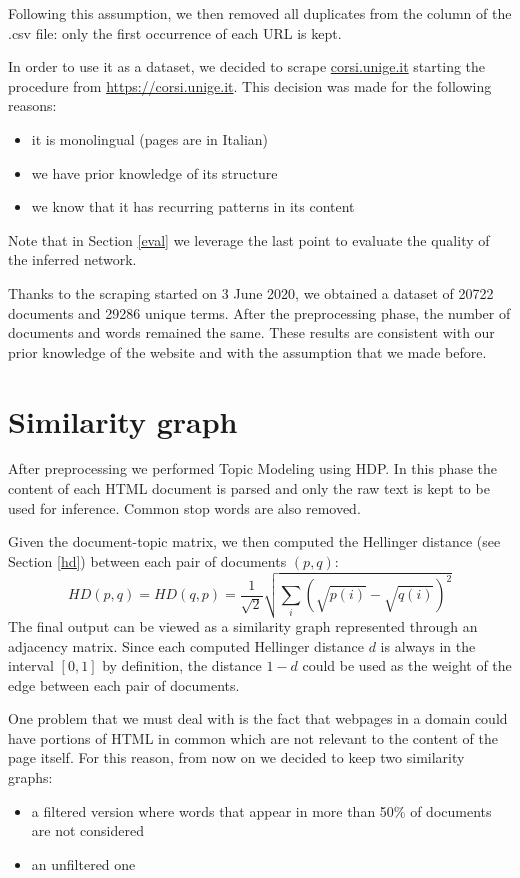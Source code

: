 Following this assumption, we then removed all duplicates from the  column
of the .csv file: only the first occurrence of each URL is kept.

In order to use it as a dataset, we decided to scrape \url{corsi.unige.it} starting the procedure from \url{https://corsi.unige.it}. 
This decision was made for the following reasons:
\begin{itemize}
    \item it is monolingual (pages are in Italian)
    \item we have prior knowledge of its structure 
    \item we know that it has recurring patterns in its content
\end{itemize}
Note that in Section \ref{eval} we leverage the last point to evaluate the quality of the inferred network.

Thanks to the scraping started on 3 June 2020, we obtained a dataset of 20722 documents and 29286 unique terms. 
After the preprocessing phase, the number of documents and words remained the same.
These results are consistent with our prior knowledge of the website and with the assumption that we made before.



\section{Similarity graph} \label{sgexp}
After preprocessing we performed Topic Modeling using HDP. 
In this phase the content of each HTML document is
parsed and only the raw text is kept to be used for inference. Common stop words are also removed.

Given the document-topic matrix,
we then computed the Hellinger distance (see Section \ref{hd}) between each pair of documents $(p, q)$:
\[\mathit{HD}(p, q) = \mathit{HD}(q, p) = \frac{1}{\sqrt{2}} \sqrt{\sum_i (\sqrt{p(i)} - \sqrt{q(i)})^2}\]
The final output can be viewed as a similarity graph represented through an adjacency matrix.
Since each computed Hellinger distance $d$ is always in the interval $[0, 1]$ by definition, the distance 
$1-d$ could be used as the weight of the edge between each pair of documents.

One problem that we must deal with is the fact that
webpages in a domain could have portions of HTML in common which are not relevant to the content of the page itself.
For this reason, from now on we decided to keep two similarity graphs:
\begin{itemize}
    \item a filtered version where words that appear in more than 50\% of documents are not considered
    \item an unfiltered one
\end{itemize}

